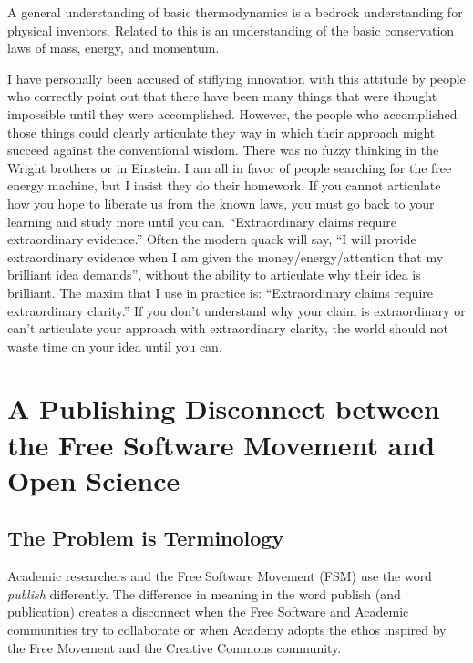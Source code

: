 \documentclass[
	fontsize=10pt, %
	twoside=false, %
	secnumdepth=1, %
]{kaobook}
\begin{document}
A general understanding of basic thermodynamics is a bedrock
understanding for physical inventors.
Related to this is an understanding of the basic conservation laws
of mass, energy, and momentum.

I have personally been accused of stiflying innovation with
this attitude by people who correctly point out that there have
been many things that were thought impossible until they were accomplished.
However, the people who accomplished those things could clearly
articulate they way in which their approach might succeed against
the conventional wisdom. There was no fuzzy thinking in the
Wright brothers or in Einstein. I am all in favor of
people searching for the free energy machine, but I insist
they do their homework.
If you cannot articulate how you hope to liberate us from the
known laws, you must go back to your learning and study more
until you can. ``Extraordinary claims require extraordinary
evidence.'' Often the modern quack will say, ``I will
provide extraordinary evidence when I am given the
money/energy/attention that my brilliant idea demands'',
without the ability to articulate why their idea is brilliant.
The maxim that I use in practice is: ``Extraordinary claims require
extraordinary clarity.''
If you don't understand why your claim is extraordinary or
can't articulate your approach with extraordinary clarity,
the world should not waste time on your idea until you can.

\chapter{A Publishing Disconnect between the Free Software Movement and Open Science}
\label{chap:publishdisconnect}

\section{The Problem is Terminology}
Academic researchers and the Free Software Movement (FSM) use the word
{\em publish} differently.  The difference in meaning in the word publish
(and publication) creates a disconnect when the Free Software and
Academic communities try to collaborate or when Academy adopts the
ethos inspired by the Free Movement and the Creative Commons
community.
\end{document}

